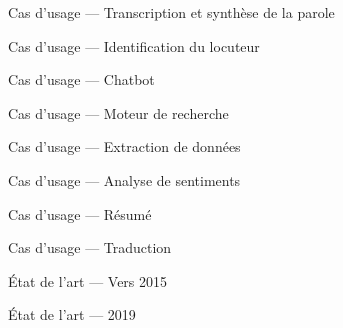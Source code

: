 
\begin{frame}{Cas d'usage --- Transcription et synthèse de la parole}
\end{frame}

\begin{frame}{Cas d'usage --- Identification du locuteur}
\end{frame}

\begin{frame}{Cas d'usage --- Chatbot}
\end{frame}

\begin{frame}{Cas d'usage --- Moteur de recherche}
\end{frame}

\begin{frame}{Cas d'usage --- Extraction de données}
\end{frame}

\begin{frame}{Cas d'usage --- Analyse de sentiments}
\end{frame}

\begin{frame}{Cas d'usage --- Résumé}
\end{frame}

\begin{frame}{Cas d'usage --- Traduction}
  \begin{center}
  \end{center}
\end{frame}

\begin{frame}{État de l'art --- Vers 2015}
\end{frame}

\begin{frame}{État de l'art --- 2019}
\end{frame}

